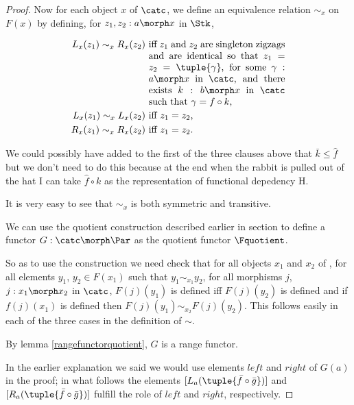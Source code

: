 \begin{proof}
Now for each object $x$ of $\catc$, 
we define an equivalence relation $\sim_x$ on $F(x)$ by defining,
for $z_1,z_2:a \morph x$ in $\Stk$,

\begin{align*}
L_x(z_1) \sim_x R_x(z_2) & \mbox{ \parbox[t]{5cm}{ iff $z_1$ and $z_2$ are
                                      singleton zigzags and 
                                      are identical so that
                                      $z_1 = z_2 = \tuple{\gamma}$, 
                                      for some 
                                      $\gamma:a \morph x$ in $\catc$, 
                                      and there exists $k:b \morph x$ 
                                      in $\catc$ 
                                      such that $\gamma = f \circ k$,}}\\
L_x(z_1) \sim_x L_x(z_2) & \mbox{ iff $z_1 = z_2$,} \\
R_x(z_1) \sim_x R_x(z_2) & \mbox{ iff $z_1 = z_2$.} \\
\end{align*}
\begin{aside}
We could  possibly have added to the first of the three clauses above
that $\bar{k}\leq \widehat{f}$ but we don't need to do 
this because at the
end when the rabbit is pulled out of the hat I can take $\widehat{f} \circ k$ as the representation of functional depedency H.
\end{aside}

It is very easy to see that $\sim_x$  is both symmetric and transitive. 

We can use  the quotient construction described earlier
in section  
to define a functor
 $G: \catc \morph \Par$  as the quotient functor $\Fquotient$.

So as to use the construction we need check
that for all objects $x_1$ and $x_2$ of \catcw, 
for all elements $y_1$, $y_2 \in F(x_1)$ such that $y_1\!\sim_{x_1}\!\! y_2$, 
for all morphisms $j$, $j: x_1 \morph x_2$ in $\catc$,
$F(j)(y_1)$ is defined iff $F(j)(y_2)$ is defined 
and if $f(j)(x_1)$ is defined then $F(j)(y_1)\!\sim_{x_2}\!\!F(j)(y_2)$. 
This follows easily in each of the three cases 
in the definition of $\sim$.

By lemma \ref{rangefunctorquotient}, $G$ is a range functor.

In the earlier explanation we said we would use elements $left$ and $right$ of $G(a)$
in the proof; in what follows
the elements
$[L_a(\tuple{\bar{f}\circ \bar{g}})]$ and $[R_a(\tuple{\bar{f}\circ \bar{g}})]$ fulfill the role of $left$ and $right$, respectively.


\end{proof}

